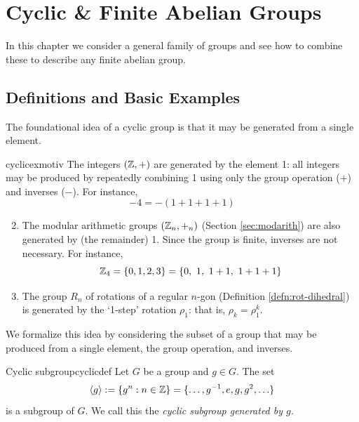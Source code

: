 \graphicspath{{3cyclic/asy/}}

\section{Cyclic \& Finite Abelian Groups}\label{chap:cyclic}

In this chapter we consider a general family of groups and see how to combine these to describe any finite abelian group.

\subsection{Definitions and Basic Examples}\label{sec:cycdef}

The foundational idea of a cyclic group is that it may be generated from a single element.

\begin{examples}{}{cyclicexmotiv}
	\exstart The integers $(\mathbb{Z},+)$ are generated by the element 1: all integers may be produced by repeatedly combining 1 using only the group operation ($+$) and inverses ($-$). For instance,
	  \[
	  	-4=-(1+1+1+1)
	  \]
	\begin{enumerate}\setcounter{enumi}{1}
	  \item\label{ex:cyclicexmotiv2} The modular arithmetic groups $(\mathbb{Z}_n,+_n)$ (Section \ref{sec:modarith}) are also generated by (the remainder) 1. Since the group is finite, inverses are not necessary. For instance,
	  \[
	  	\Z_4=\{0,1,2,3\}=\{0,\ 1,\ 1+1,\ 1+1+1\}
	  \]
	 	\item The group $R_n$ of rotations of a regular $n$-gon (Definition \ref{defn:rot-dihedral}) is generated by the `1-step' rotation $\rho_1$: that is, $\rho_k=\rho_1^k$.
	\end{enumerate}
\end{examples}

We formalize this idea by considering the subset of a group that may be produced from a single element, the group operation, and inverses.

\begin{lemm}{Cyclic subgroup}{cyclicdef}
	Let $G$ be a group and $g\in G$. The set
	\[
		\left\langle g\right\rangle:=\{g^n:n\in\mathbb{Z}\}=\{\ldots,g^{-1},e,g,g^2,\ldots\}
	\]
	is a subgroup of $G$. We call this the \emph{cyclic subgroup\footnotemark{} generated by $g$.}
\end{lemm}


